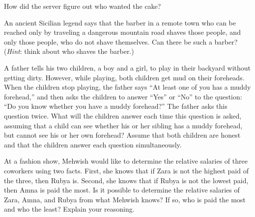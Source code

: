 \documentclass[a4paper]{exam}
\begin{document}
\begin{questions}
  How did the server figure out who wanted the cake?
  \begin{solution}
  \end{solution}
  
  \question An ancient Sicilian legend says that the barber in a remote town who can be reached only by traveling a dangerous mountain road shaves those people, and only those people, who do not shave themselves. Can there be such a barber? (\textit{Hint}: think about who shaves the barber.)
  \begin{solution}
  \end{solution}
  
  \question A father tells his two children, a boy and a girl, to play in their backyard without getting dirty. However, while playing, both children get mud on their foreheads. When the children stop playing, the father says ``At least one of you has a muddy forehead,'' and then asks the children to answer ``Yes'' or ``No'' to the question: ``Do you know whether you have a muddy forehead?'' The father asks this question twice. What will the children answer each time this question is asked, assuming that a child can see whether his or her sibling has a muddy forehead, but cannot see his or her own forehead? Assume that both children are honest and that the children answer each question simultaneously.
  \begin{solution}
  \end{solution}
  
  \question At a fashion show, Mehwish would like to determine the relative salaries of three coworkers using two facts. First, she knows that if Zara is not the highest paid of the three, then Rubya is. Second, she knows that if Rubya is not the lowest paid, then Amna is paid the most. Is it possible to determine the relative salaries of Zara, Amna, and Rubya from what Mehwish knows? If so, who is paid the most and who the least? Explain your reasoning.
  \begin{solution}
  \end{solution}
\end{questions}
\end{document}
